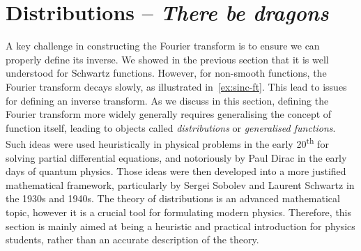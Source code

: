 \section{Distributions -- \textit{There be dragons}} A key challenge in constructing the
Fourier transform is to ensure we can properly define its inverse. We showed in the
previous section that it is well understood for Schwartz functions. However, for
non-smooth functions, the Fourier transform decays slowly, as illustrated
in~\cref{ex:sinc-ft}. This lead to issues for defining an inverse transform. As we discuss
in this section, defining the Fourier transform more widely generally requires
generalising the concept of function itself, leading to objects called
\emph{distributions} or \emph{generalised functions}. Such ideas were used heuristically
in physical problems in the early 20\textsuperscript{th} for solving partial differential
equations, and notoriously by Paul Dirac in the early days of quantum physics. Those ideas
were then developed into a more justified mathematical framework, particularly by Sergei
Sobolev and Laurent Schwartz in the 1930s and 1940s. The theory of distributions is an
advanced mathematical topic, however it is a crucial tool for formulating modern physics.
Therefore, this section is mainly aimed at being a heuristic and practical introduction
for physics students, rather than an accurate description of the theory.


